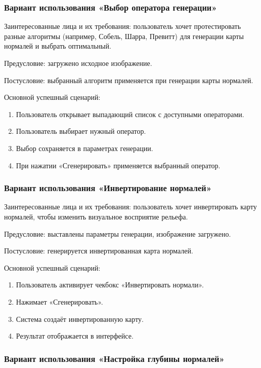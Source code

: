 \subsubsection{Вариант использования «Выбор оператора генерации»}

Заинтересованные лица и их требования: пользователь хочет протестировать разные алгоритмы (например, Собель, Шарра, Превитт) для генерации карты нормалей и выбрать оптимальный.

Предусловие: загружено исходное изображение.

Постусловие: выбранный алгоритм применяется при генерации карты нормалей.

Основной успешный сценарий:
\begin{enumerate}
	\item Пользователь открывает выпадающий список с доступными операторами.
	\item Пользователь выбирает нужный оператор.
	\item Выбор сохраняется в параметрах генерации.
	\item При нажатии «Сгенерировать» применяется выбранный оператор.
\end{enumerate}
\subsubsection{Вариант использования «Инвертирование нормалей»}

Заинтересованные лица и их требования: пользователь хочет инвертировать карту нормалей, чтобы изменить визуальное восприятие рельефа.

Предусловие: выставлены параметры генерации, изображение загружено.

Постусловие: генерируется инвертированная карта нормалей.

Основной успешный сценарий:
\begin{enumerate}
	\item Пользователь активирует чекбокс «Инвертировать нормали».
	\item Нажимает «Сгенерировать».
	\item Система создаёт инвертированную карту.
	\item Результат отображается в интерфейсе.
\end{enumerate}
\subsubsection{Вариант использования «Настройка глубины нормалей»}

